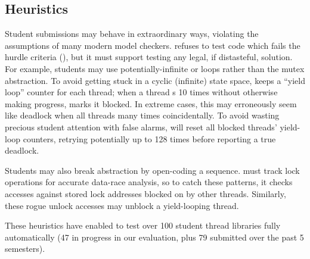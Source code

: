 \subsection{Heuristics}

Student submissions may behave in extraordinary ways, violating the assumptions of many modern model checkers.
\landslide refuses to test code which fails the hurdle criteria (\sect{\ref{sec:grading}}),
but it must support testing any legal, if distasteful, solution.
For example, students may use potentially-infinite  or  loops rather than the mutex abstraction. %
To avoid getting stuck in a cyclic (infinite) state space, \landslide keeps a ``yield loop'' counter for each thread;
when a thread s 10 times without otherwise making progress, \landslide marks it blocked.
%
In extreme cases, this may erroneously seem like deadlock when all threads  many times coincidentally.
To avoid wasting precious student attention with false alarms, %
\landslide will reset all blocked threads' yield-loop counters,
retrying potentially up to 128 times before reporting a true deadlock.

Students may also break abstraction by open-coding a  sequence.
\landslide must track lock operations for accurate data-race analysis,
so to catch these patterns, it
checks accesses against stored lock addresses blocked on by other threads.
Similarly, these rogue unlock accesses may unblock a yield-looping thread.

These heuristics have enabled \landslide to test over 100 student thread libraries
fully automatically
(47 in progress in our evaluation, plus
79 submitted over the past 5 semesters).
